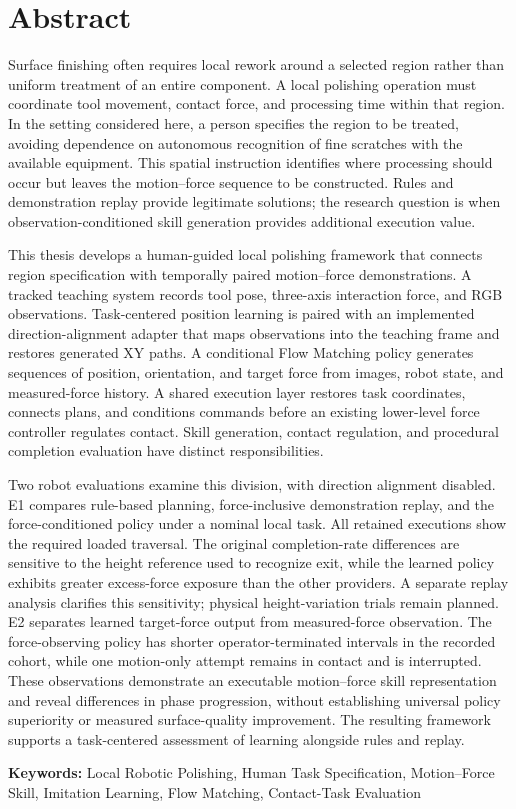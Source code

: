 \chapter*{Abstract}
\begin{center}\large\bfseries\thesistitle\end{center}

Surface finishing often requires local rework around a selected region rather than uniform treatment of an entire component. A local polishing operation must coordinate tool movement, contact force, and processing time within that region. In the setting considered here, a person specifies the region to be treated, avoiding dependence on autonomous recognition of fine scratches with the available equipment. This spatial instruction identifies where processing should occur but leaves the motion--force sequence to be constructed. Rules and demonstration replay provide legitimate solutions; the research question is when observation-conditioned skill generation provides additional execution value.

This thesis develops a human-guided local polishing framework that connects region specification with temporally paired motion--force demonstrations. A tracked teaching system records tool pose, three-axis interaction force, and RGB observations. Task-centered position learning is paired with an implemented direction-alignment adapter that maps observations into the teaching frame and restores generated XY paths. A conditional Flow Matching policy generates sequences of position, orientation, and target force from images, robot state, and measured-force history. A shared execution layer restores task coordinates, connects plans, and conditions commands before an existing lower-level force controller regulates contact. Skill generation, contact regulation, and procedural completion evaluation have distinct responsibilities.

Two robot evaluations examine this division, with direction alignment disabled. E1 compares rule-based planning, force-inclusive demonstration replay, and the force-conditioned policy under a nominal local task. All retained executions show the required loaded traversal. The original completion-rate differences are sensitive to the height reference used to recognize exit, while the learned policy exhibits greater excess-force exposure than the other providers. A separate replay analysis clarifies this sensitivity; physical height-variation trials remain planned. E2 separates learned target-force output from measured-force observation. The force-observing policy has shorter operator-terminated intervals in the recorded cohort, while one motion-only attempt remains in contact and is interrupted. These observations demonstrate an executable motion--force skill representation and reveal differences in phase progression, without establishing universal policy superiority or measured surface-quality improvement. The resulting framework supports a task-centered assessment of learning alongside rules and replay.

\vspace{0.4cm}
\noindent\textbf{Keywords:} Local Robotic Polishing, Human Task Specification, Motion--Force Skill, Imitation Learning, Flow Matching, Contact-Task Evaluation

